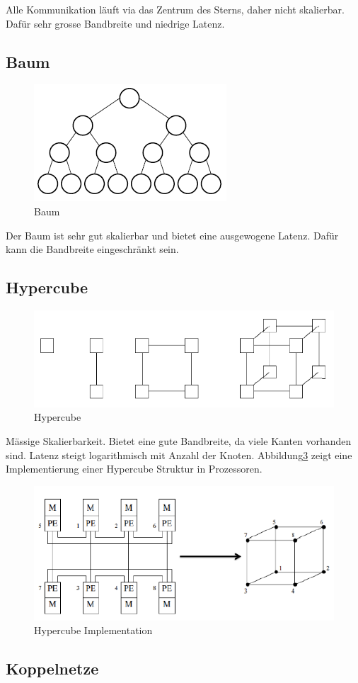 Alle Kommunikation läuft via das Zentrum des Sterns, daher nicht skalierbar. Dafür sehr grosse Bandbreite und niedrige Latenz.

\subsection{Baum}
\begin{figure}[h]
\centering
\includegraphics[width=0.2\linewidth]{fig/baum}
\caption{Baum}
\label{fig:baum}
\end{figure}

Der Baum ist sehr gut skalierbar und bietet eine ausgewogene Latenz. Dafür kann die Bandbreite eingeschränkt sein.

\subsection{Hypercube}
\begin{figure}[h]
\centering
\includegraphics[width=0.2\linewidth]{fig/hypercube}
\caption{Hypercube}
\label{fig:hypercube}
\end{figure}

Mässige Skalierbarkeit. Bietet eine gute Bandbreite, da viele Kanten vorhanden sind. Latenz steigt logarithmisch mit Anzahl der Knoten. Abbildung\ref{fig:hypercube_impl} zeigt eine Implementierung einer Hypercube Struktur in Prozessoren.

\begin{figure}
\centering[h]
\includegraphics[width=0.7\linewidth]{fig/hypercube_impl}
\caption{Hypercube Implementation}
\label{fig:hypercube_impl}
\end{figure}

\subsection{Koppelnetze}
